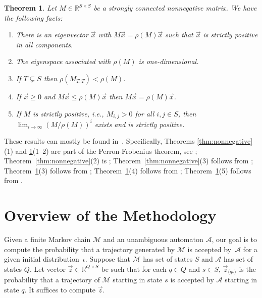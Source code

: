 \documentclass{elsarticle}
\newtheorem{theorem}[definition]{Theorem}
\def\<{\langle}
\def\>{\rangle}
\def\cA{\mathcal{A}}
\def\cM{\mathcal{M}}
\begin{document}
\begin{theorem}
  Let $M\in \mathbb{R}^{S\times S}$ be a strongly connected nonnegative
  matrix.  We have the following facts:
\begin{enumerate}
\item There is an eigenvector $\vec{x}$ with
  $M\vec{x}=\rho(M)\vec{x}$ such that $\vec{x}$ is
  strictly positive in all components.
\item The eigenspace associated with $\rho(M)$ is one-dimensional.
\item If $T \subsetneq S$ then $\rho(M_{T,T}) < \rho(M)$.
\item If $\vec{x} \geqslant 0$ and  $M\vec{x} \leqslant \rho(M)\vec{x}$
then $M\vec{x} = \rho(M)\vec{x}$.
\item If $M$ is strictly positive, i.e., $M_{i,j}>0$ for all $i,j \in S$, then $\lim_{i \to \infty} \left( M / \rho(M) \right)^i$ exists and is strictly positive.
\end{enumerate}
\label{thm:irreducible}
\end{theorem}

These results can mostly be found in~\cite[Chapter 2]{book:BermanP94}.
Specifically, Theorems \ref{thm:nonnegative}(1) and \ref{thm:irreducible}(1--2) are part of the Perron-Frobenius theorem, see \cite[Theorems 2.1.1, 2.1.4]{book:BermanP94};
Theorem~\ref{thm:nonnegative}(2) is \cite[Corollary 2.1.6(a)]{book:BermanP94};
Theorem~\ref{thm:nonnegative}(3) follows from \cite[Corollary 2.1.6(b)]{book:BermanP94};
Theorem~\ref{thm:irreducible}(3) follows from \cite[Corollary 2.1.6]{book:BermanP94};
Theorem~\ref{thm:irreducible}(4) follows from \cite[Corollary 2.1.11]{book:BermanP94};
Theorem~\ref{thm:irreducible}(5) follows from \cite[Theorem 8.2.7]{HornJohnson13}.


\section{Overview of the Methodology} \label{sec:overview}

Given a finite Markov chain $\cM$ and an unambiguous automaton $\cA$,
our goal is to compute the probability that a trajectory
generated by $\cM$ is accepted by~$\cA$ for a given initial distribution~$\iota$.  Suppose that $\cM$ has set
of states $S$ and $\cA$ has set of states $Q$.  Let vector
$\vec{z} \in \mathbb{R}^{Q\times S}$ be such that for each $q\in Q$
and $s\in S$, $\vec{z}_{\<qs\>}$ is the probability that a trajectory
of $\cM$ starting in state $s$ is accepted by $\cA$ starting in state
$q$.  It suffices to compute $\vec{z}$.
\end{document}
